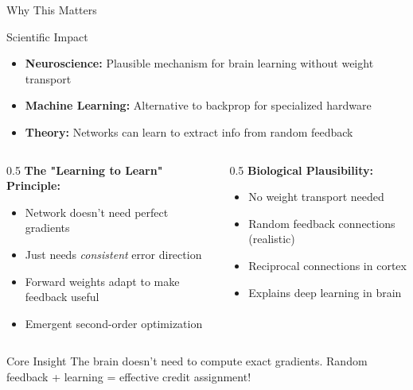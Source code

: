 \documentclass[aspectratio=169,10pt]{beamer}
\begin{document}
\begin{frame}{Why This Matters}
  \begin{block}{Scientific Impact}
    \begin{itemize}
      \item \textbf{Neuroscience:} Plausible mechanism for brain learning without weight transport
      \item \textbf{Machine Learning:} Alternative to backprop for specialized hardware
      \item \textbf{Theory:} Networks can learn to extract info from random feedback
    \end{itemize}
  \end{block}

  \vspace{0.3cm}
  \begin{columns}[T]
    \begin{column}{0.5\textwidth}
      \textbf{The "Learning to Learn" Principle:}
      \begin{itemize}
        \item Network doesn't need perfect gradients
        \item Just needs \textit{consistent} error direction
        \item Forward weights adapt to make feedback useful
        \item Emergent second-order optimization
      \end{itemize}
    \end{column}

    \begin{column}{0.5\textwidth}
      \textbf{Biological Plausibility:}
      \begin{itemize}
        \item No weight transport needed
        \item Random feedback connections (realistic)
        \item Reciprocal connections in cortex
        \item Explains deep learning in brain
      \end{itemize}
    \end{column}
  \end{columns}

  \vspace{0.3cm}
  \begin{alertblock}{Core Insight}
    The brain doesn't need to compute exact gradients. Random feedback + learning = effective credit assignment!
  \end{alertblock}
\end{frame}
\end{document}
